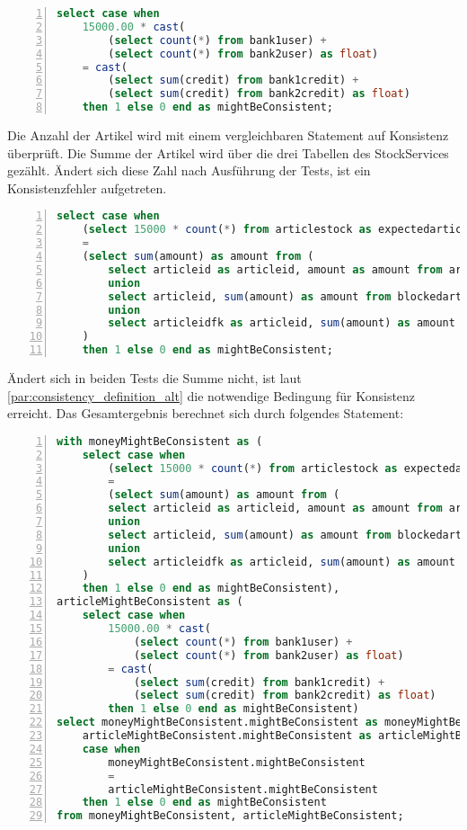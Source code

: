 \begin{lstlisting}[language=SQL, breaklines=true, tabsize=2, showstringspaces=false, frame=single, numbers=left, basicstyle=\small] 
select case when 
	15000.00 * cast(
		(select count(*) from bank1user) + 
		(select count(*) from bank2user) as float) 
	= cast(
		(select sum(credit) from bank1credit) + 
		(select sum(credit) from bank2credit) as float)
	then 1 else 0 end as mightBeConsistent;
\end{lstlisting}\label{}

Die Anzahl der Artikel wird mit einem vergleichbaren Statement auf Konsistenz überprüft. Die Summe der Artikel wird über die drei Tabellen des StockServices gezählt. Ändert sich diese Zahl nach Ausführung der Tests, ist ein Konsistenzfehler aufgetreten.

\begin{lstlisting}[language=SQL, breaklines=true, tabsize=2, showstringspaces=false, frame=single, numbers=left, basicstyle=\small] 
select case when 
	(select 15000 * count(*) from articlestock as expectedarticlesum) 
	= 
	(select sum(amount) as amount from (
		select articleid as articleid, amount as amount from articlestock
		union
		select articleid, sum(amount) as amount from blockedarticles group by articleid
		union
		select articleidfk as articleid, sum(amount) as amount from shippedarticles group by articleidfk) as actualarticlesum
	)
	then 1 else 0 end as mightBeConsistent;
\end{lstlisting}

Ändert sich in beiden Tests die Summe nicht, ist laut \cref{par:consistency_definition_alt} die notwendige Bedingung für Konsistenz erreicht. Das Gesamtergebnis berechnet sich durch folgendes Statement:
\begin{lstlisting}[language=SQL, breaklines=true, tabsize=2, showstringspaces=false, frame=single, numbers=left, basicstyle=\small] 
with moneyMightBeConsistent as (
	select case when 
		(select 15000 * count(*) from articlestock as expectedarticlesum) 
		= 
		(select sum(amount) as amount from (
		select articleid as articleid, amount as amount from articlestock
		union
		select articleid, sum(amount) as amount from blockedarticles group by articleid
		union
		select articleidfk as articleid, sum(amount) as amount from shippedarticles group by articleidfk) as actualarticlesum
	)
	then 1 else 0 end as mightBeConsistent),
articleMightBeConsistent as (
	select case when 
		15000.00 * cast(
			(select count(*) from bank1user) + 
			(select count(*) from bank2user) as float) 
		= cast(
			(select sum(credit) from bank1credit) + 
			(select sum(credit) from bank2credit) as float)
		then 1 else 0 end as mightBeConsistent) 
select moneyMightBeConsistent.mightBeConsistent as moneyMightBeConsistent,
	articleMightBeConsistent.mightBeConsistent as articleMightBeConsistent,
	case when 
		moneyMightBeConsistent.mightBeConsistent 
		= 
		articleMightBeConsistent.mightBeConsistent 
	then 1 else 0 end as mightBeConsistent
from moneyMightBeConsistent, articleMightBeConsistent;
\end{lstlisting}

